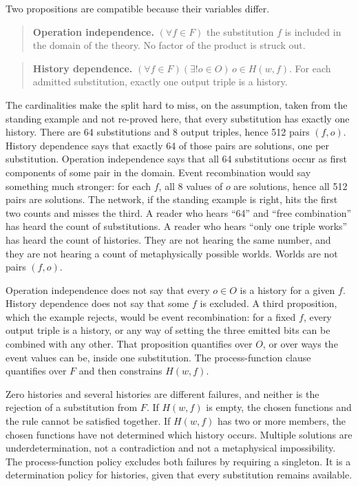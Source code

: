 \documentclass[12pt]{article}
\begin{document}
Two propositions are compatible because their variables differ.

\begin{quote}
\textbf{Operation independence.} \((\forall f\in F)\) the substitution \(f\) is included in the domain of the theory. No factor of the product is struck out.
\end{quote}

\begin{quote}
\textbf{History dependence.} \((\forall f\in F)(\exists! o\in O)\,o\in H(w,f)\). For each admitted substitution, exactly one output triple is a history.
\end{quote}

The cardinalities make the split hard to miss, on the assumption, taken from the standing example and not re-proved here, that every substitution has exactly one history. There are 64 substitutions and 8 output triples, hence 512 pairs \((f,o)\). History dependence says that exactly 64 of those pairs are solutions, one per substitution. Operation independence says that all 64 substitutions occur as first components of some pair in the domain. Event recombination would say something much stronger: for each \(f\), all 8 values of \(o\) are solutions, hence all 512 pairs are solutions. The network, if the standing example is right, hits the first two counts and misses the third. A reader who hears ``64'' and ``free combination'' has heard the count of substitutions. A reader who hears ``only one triple works'' has heard the count of histories. They are not hearing the same number, and they are not hearing a count of metaphysically possible worlds. Worlds are not pairs \((f,o)\).

Operation independence does not say that every \(o\in O\) is a history for a given \(f\). History dependence does not say that some \(f\) is excluded. A third proposition, which the example rejects, would be event recombination: for a fixed \(f\), every output triple is a history, or any way of setting the three emitted bits can be combined with any other. That proposition quantifies over \(O\), or over ways the event values can be, inside one substitution. The process-function clause quantifies over \(F\) and then constrains \(H(w,f)\).

Zero histories and several histories are different failures, and neither is the rejection of a substitution from \(F\). If \(H(w,f)\) is empty, the chosen functions and the rule cannot be satisfied together. If \(H(w,f)\) has two or more members, the chosen functions have not determined which history occurs. Multiple solutions are underdetermination, not a contradiction and not a metaphysical impossibility. The process-function policy excludes both failures by requiring a singleton. It is a determination policy for histories, given that every substitution remains available.
\end{document}
